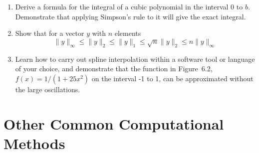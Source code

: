 \documentclass{article}
\begin{document}
\begin{enumerate}
\item Derive a formula for the integral of a cubic polynomial in the interval 0 to $b$. Demonstrate that applying Simpson's rule to it will give the exact integral.

\item Show that for a vector $y$ with $n$ elements
  \[
  \lVert y \rVert_\infty
  \leq \lVert y \rVert_2
  \leq \lVert y \rVert_1
  \leq \sqrt{n} \lVert y \rVert_2
  \leq n \lVert y \rVert_\infty
  \]


\item Learn how to carry out spline interpolation within a software tool or language of your choice, and demonstrate that the function in Figure~6.2, $f(x)=1/(1+25x^2)$ on the interval -1 to 1, can be approximated without the large oscillations.

  
\end{enumerate}
 







\newpage
\section{Other Common Computational Methods}
\end{document}
